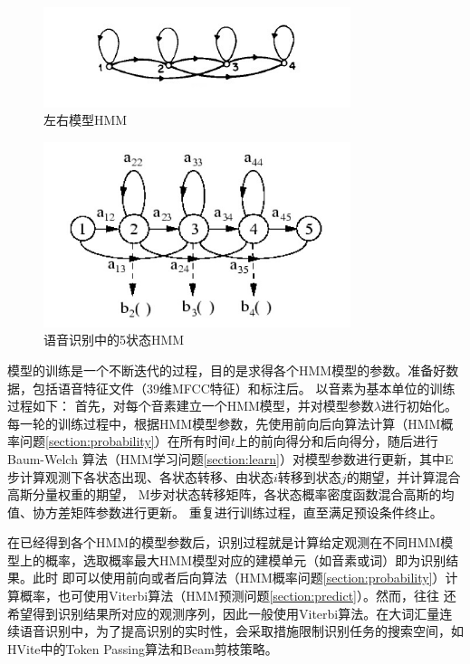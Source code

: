     \begin{figure}
    \centering
    \includegraphics[width=0.8\textwidth]{figures/chapter2/left_right}
    \caption{左右模型HMM}
    \label{fig:left_right}
    \end{figure}

    \begin{figure}
    \centering
    \includegraphics[width=0.8\textwidth]{figures/chapter2/asr_hmm}
    \caption{语音识别中的5状态HMM}
    \label{fig:asr_hmm}
    \end{figure}

    模型的训练是一个不断迭代的过程，目的是求得各个HMM模型的参数。准备好数据，包括语音特征文件（39维MFCC特征）和标注后。
    以音素为基本单位的训练过程如下：
    首先，对每个音素建立一个HMM模型，并对模型参数$\lambda $进行初始化。
    每一轮的训练过程中，根据HMM模型参数，先使用前向后向算法计算（HMM概率问题\ref{section:probability}）在所有时间$t$上的前向得分和后向得分，随后进行Baum-Welch
    算法（HMM学习问题\ref{section:learn}）对模型参数进行更新，其中E步计算观测下各状态出现、各状态转移、由状态$i$转移到状态$j$的期望，并计算混合高斯分量权重的期望，
    M步对状态转移矩阵，各状态概率密度函数混合高斯的均值、协方差矩阵参数进行更新。
    重复进行训练过程，直至满足预设条件终止。

    在已经得到各个HMM的模型参数后，识别过程就是计算给定观测在不同HMM模型上的概率，选取概率最大HMM模型对应的建模单元（如音素或词）即为识别结果。此时
    即可以使用前向或者后向算法（HMM概率问题\ref{section:probability}）计算概率，也可使用Viterbi算法（HMM预测问题\ref{section:predict}）。然而，往往
    还希望得到识别结果所对应的观测序列，因此一般使用Viterbi算法。在大词汇量连续语音识别中，为了提高识别的实时性，会采取措施限制识别任务的搜索空间，如
    HVite中的Token Passing\cite{young1989token}算法和Beam剪枝策略。

